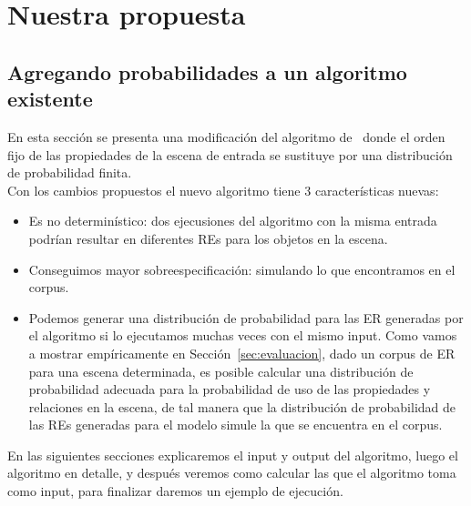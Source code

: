 \chapter{Nuestra propuesta}
\label{sec:algoritmo}
\section{Agregando probabilidades a un algoritmo existente}

En esta secci\'on se presenta una modificaci\'on del algoritmo
de~\cite{arec2:2008:Areces} donde el orden fijo de las propiedades de
la escena de entrada se sustituye por una distribuci\'on de probabilidad finita. \\


Con los cambios propuestos el nuevo algoritmo tiene 3 caracter\'isticas nuevas:
\begin{itemize}
 \item Es no determin\'istico: dos ejecusiones del algoritmo con la
misma entrada podr\'{i}an resultar en diferentes REs para los objetos en la escena.\\

 \item Conseguimos mayor sobreespecificaci\'on: simulando lo que encontramos en el corpus.\\

 \item Podemos generar una distribuci\'on de probabilidad
para las ER generadas por el algoritmo si lo ejecutamos muchas veces con
el mismo input. Como vamos a mostrar emp\'{i}ricamente en
Secci\'on~\ref{sec:evaluacion}, dado un corpus de ER para una escena determinada,
es posible calcular una distribuci\'on de probabilidad adecuada para la
probabilidad de uso de las propiedades y relaciones en la escena, de tal manera que
la distribuci\'on de probabilidad de las REs generadas para el modelo
simule la que se encuentra en el corpus.\\
\end{itemize}

En las siguientes secciones explicaremos el input y output del algoritmo, luego el algoritmo en detalle, y despu\'es veremos como calcular las \puse que el algoritmo toma como input, para finalizar daremos un ejemplo de ejecuci\'on.


